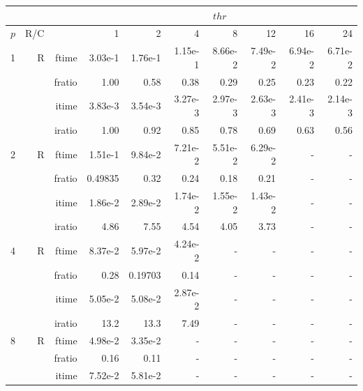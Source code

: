 \documentclass[a4paper]{article}
\begin{document}
\begin{table}[htbp]
\begin{center}
\begin{small}
\begin{tabular}{|r|r|r|r|r|r|r|r|r|r|}
\hline 
     & & & \multicolumn{7}{c|}{$thr$} \\ \hline
    $p$ & R/C &  & 1           & 2    & 4    & 8    & 12   & 16    & 24  \\ \hline\hline
   1 &  R &   ftime &    3.03e-1 &    1.76e-1 &    1.15e-1 &    8.66e-2 &    7.49e-2 &    6.94e-2 &    6.71e-2 \\
             &             &  fratio &    1.00 &    0.58 &    0.38 &   0.29 &    0.25 &    0.23 &    0.22 \\
             &             &  itime &    3.83e-3 &    3.54e-3 &    3.27e-3 &    2.97e-3 &    2.63e-3 &    2.41e-3 &    2.14e-3 \\
             &             &  iratio &    1.00 &    0.92 &    0.85 &    0.78 &   0.69 &    0.63 &    0.56 \\\hline
   2 &  R &   ftime &    1.51e-1 &    9.84e-2 &    7.21e-2 &    5.51e-2 &    6.29e-2 &      - &      - \\
             &             &  fratio &    0.49835 &    0.32 &    0.24 &    0.18 &   0.21 &      - &      - \\
             &             &  itime &    1.86e-2 &    2.89e-2 &    1.74e-2 &    1.55e-2 &    1.43e-2 &      - &      - \\
             &             &  iratio &    4.86  &   7.55  &    4.54  &   4.05  &    3.73  &      - &      - \\\hline
   4 &  R &   ftime &    8.37e-2 &    5.97e-2 &    4.24e-2 &      - &      - &      - &      - \\
             &             &  fratio &    0.28 &    0.19703 &    0.14 &      - &      - &      - &      - \\
             &             &  itime &    5.05e-2 &    5.08e-2 &    2.87e-2 &      - &      - &      - &      - \\
             &             &  iratio &    13.2 &   13.3 &   7.49  &      - &      - &      - &      - \\\hline
   8 &   R &   ftime &    4.98e-2 &    3.35e-2 &      - &      - &      - &      - &      - \\
             &             &  fratio &    0.16 &    0.11 &      - &      - &      - &      - &      - \\
             &             &  itime &    7.52e-2 &    5.81e-2 &      - &      - &      - &      - &      - \\

\end{tabular}
\end{small}
\end{center}
\end{table}
\end{document}
